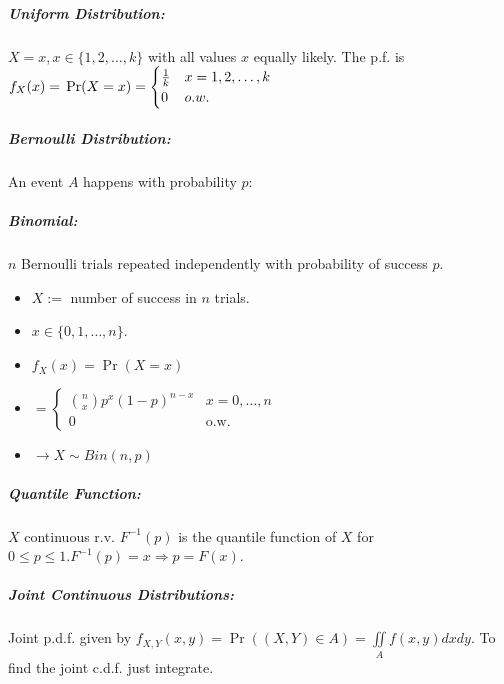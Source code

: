 \documentclass[landscape,10pt]{article}
\begin{document}
\begin{multicols}{4}
    \subparagraph*{Uniform Distribution: }
        \(X = x, x \in \{1, 2, \ldots, k\}\) with all values \(x\) equally likely. The p.f. is \(f_X(x) =\\ \Pr(X=x) =  \begin{cases} \frac      {1}{k} & x = 1, 2, \ldots, k \\ 0 & o.w. \end{cases} \)

    \subparagraph*{Bernoulli Distribution: }
        An event \(A\) happens with probability \(p\):

    \subparagraph*{Binomial:}
        \(n\) Bernoulli trials repeated independently with probability of success \(p\). 
        \begin{itemize}
            \item[] \(X :=\) number of success in \(n\) trials. 
            \item[] \(x \in \{0, 1, \ldots, n\}\). 
            \item[] \(f_X(x) = \Pr(X=x)\)
            \item[] \( =
    \begin{cases}
    {n \choose x} p^x (1-p)^{n-x}   &   x=0, \ldots, n \\
    0                               &   \text{o.w.}
    \end{cases} \)
            \item[] \(\rightarrow X \sim Bin(n,p)\)
        \end{itemize}

        \subparagraph*{Quantile Function: }
        \(X\) continuous r.v. \(F^{-1}(p)\) is the quantile function of \(X\) for \(0 \leq p \leq 1. F^{-1}(p) = x \Rightarrow p = F(x)\).

    \subparagraph*{Joint Continuous Distributions: }
    Joint p.d.f. given by \(f_{X,Y}(x,y) = \Pr((X,Y) \in A) = \iint\limits_{A} f(x,y)dxdy\). To find the joint c.d.f. just integrate.


\end{multicols}
\end{document}
